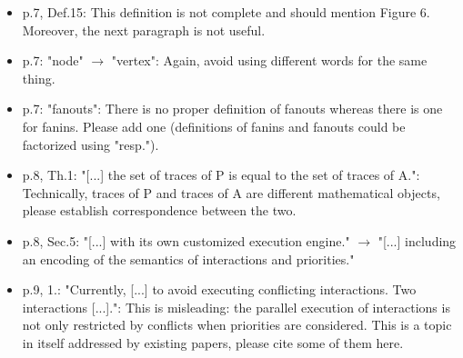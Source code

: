\begin{itemize}
\item p.7, Def.15: This definition is not complete and should mention Figure 6. 
Moreover, the next paragraph is not useful.
\done

\item p.7: "node" $\rightarrow$ "vertex": Again, avoid using different words for the same 
thing.

\done

\item p.7: "fanouts": There is no proper definition of fanouts whereas there is 
one for fanins. Please add one (definitions of fanins and fanouts could be 
factorized using "resp.").
\done
{}

\item p.8, Th.1: "[...] the set of traces of P is equal to the set of traces of 
A.": Technically, traces of P and traces of A are different mathematical 
objects, please establish correspondence between the two.
\done
{}

\item p.8, Sec.5: "[...] with its own customized execution engine." $\rightarrow$ "[...] 
including an encoding of the semantics of interactions and priorities."
\done 
\item p.9, 1.: "Currently, [...] to avoid executing conflicting interactions. Two 
interactions [...].": This is misleading: the parallel execution of 
interactions is not only restricted by conflicts when priorities are 
considered. This is a topic in itself addressed by existing papers, please 
cite some of them here.
\done


\end{itemize}
